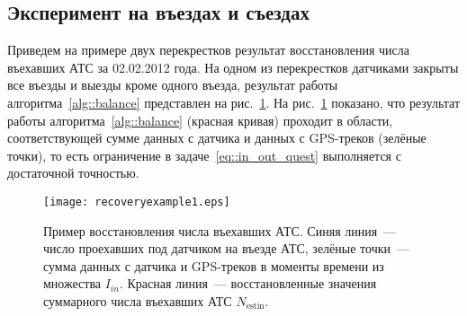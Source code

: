 \begin{table}[!ht]
    \centering
    \caption{Сравнение моделей при плотности $\rho_\text{det}>0.2$}
    \label{tab::model_compare_high}
\end{table}


\subsection{Эксперимент на въездах и съездах}
Приведем на примере двух перекрестков результат восстановления числа въехавших АТС за 02.02.2012 года.
На одном из перекрестков датчиками закрыты все въезды и выезды кроме одного въезда, результат работы алгоритма~\ref{alg::balance} представлен на рис.~\ref{fig:recex1}.
На рис.~\ref{fig:recex1} показано, что результат работы алгоритма~\ref{alg::balance} (красная кривая) проходит в области, соответствующей сумме данных с датчика и данных с GPS-треков (зелёные точки), то есть ограничение в задаче~\eqref{eq::in_out_quest} выполняется с достаточной точностью.
\begin{figure}[!ht]
\begin{center}
\texttt{[image: recoveryexample1.eps]}
\caption{Пример восстановления числа въехавших АТС. Синяя линия~--- число проехавших под датчиком на въезде АТС, зелёные точки~--- сумма данных с датчика и GPS-треков в моменты времени из множества $I_{in}$. Красная линия~--- восстановленные значения суммарного числа въехавших АТС $N_\text{estin}$.}
\label{fig:recex1}
\end{center}
\end{figure}

